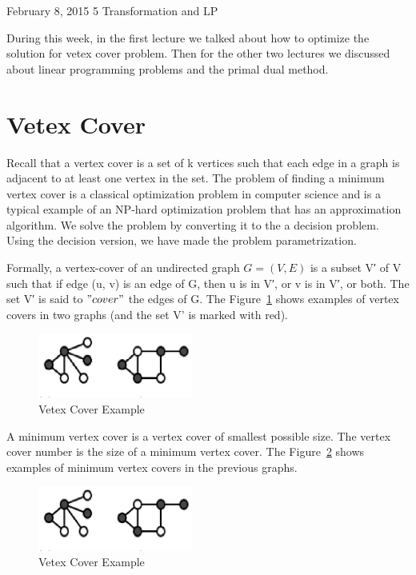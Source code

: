 \documentclass[usletter]{article}
\begin{document}
           {February 8, 2015}                          %
           {5}                                       %
           {Transformation and LP}  %

\noindent
During this week, in the first lecture we talked about how to optimize the solution for vetex cover problem. Then for the other two lectures we discussed about linear programming problems and the primal dual method. 

\section{Vetex Cover}
Recall that a vertex cover is a set of k vertices such that each edge in a graph is adjacent to at least one vertex in the set. The problem of finding a minimum vertex cover is a classical optimization problem in computer science and is a typical example of an NP-hard optimization problem that has an approximation algorithm.  We solve the problem by converting it to the a decision problem. Using the decision version, we have made the problem parametrization.

Formally, a vertex-cover of an undirected graph $G=(V, E)$ is a subset V′ of V such that if edge (u, v) is an edge of G, then u is in V′, or v is in V′, or both. The set V′ is said to $"cover"$ the edges of G. The Figure~\ref{fig:example} shows examples of vertex covers in two graphs (and the set V' is marked with red).
\begin{figure}[bht]
\begin{center}
     \includegraphics[width=2.0in]{figures/vc1}
\caption{\label{fig:example}Vetex Cover Example}
\end{center}
\end{figure}

A minimum vertex cover is a vertex cover of smallest possible size. The vertex cover number is the size of a minimum vertex cover. The Figure~\ref{fig:solution} shows examples of minimum vertex covers in the previous graphs.
\begin{figure}[bht]
\begin{center}
     \includegraphics[width=2.0in]{figures/vc1}
\caption{\label{fig:solution}Vetex Cover Example}
\end{center}
\end{figure}
\end{document}

